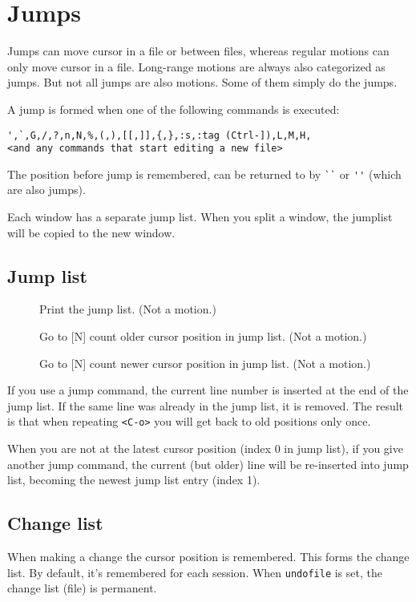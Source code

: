 \documentclass{article}
\begin{document}
\section{Jumps}
Jumps can move cursor in a file or between files, whereas regular motions can only move cursor in a file.
Long-range motions are always also categorized as jumps. But not all jumps are also motions. Some of them simply do the jumps.

A jump is formed when one of the following commands is executed:
\begin{lstlisting}[columns=flexible]
',`,G,/,?,n,N,%,(,),[[,]],{,},:s,:tag (Ctrl-]),L,M,H,
<and any commands that start editing a new file>
\end{lstlisting}
The position before jump is remembered, can be returned to by \verb|``| or \verb|''| (which are also jumps).

Each window has a separate jump list. When you split a window, the jumplist will be copied to the new window.
\subsection{Jump list}
\begin{description}
  \item[] Print the jump list. (Not a motion.)
  \item[] Go to [N] count older cursor position in jump list. (Not a motion.)
  \item[] Go to [N] count newer cursor position in jump list. (Not a motion.)
\end{description}

If you use a jump command, the current line number is inserted at the end of
the jump list.  If the same line was already in the jump list, it is removed.
The result is that when repeating \verb|<C-o>| you will get back to old positions
only once.

When you are not at the latest cursor position (index 0 in jump list), if you give another jump command, the current (but older) line will be re-inserted into jump list, becoming the newest jump list entry (index 1).
\subsection{Change list}
When making a change the cursor position is remembered. This forms the change list. By default, it's remembered for each session. When \verb|undofile| is set, the change list (file) is permanent.
\end{document}

